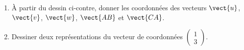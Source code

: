 
\begin{exercice}\label{exosmath-0103}

    \begin{multicols}{2}
        \begin{enumerate}
            \item
                À partir du dessin ci-contre, donner les coordonnées des vecteurs \( \vect{ u }\), \( \vect{ v }\), \( \vect{ w }\), \( \vect{ AB }\) et \( \vect{ CA }\).
            \item
                Dessiner deux représentations du vecteur de coordonnées \( \begin{pmatrix}
                    1    \\ 
                    3    
                \end{pmatrix}\).
             
        \end{enumerate}
        \columnbreak


    \end{multicols}


\end{exercice}
